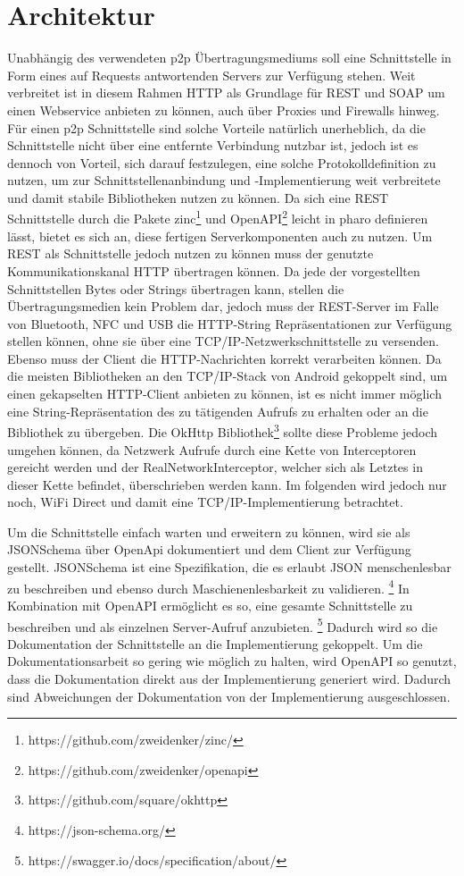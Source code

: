 \section{Architektur}

    Unabhängig des verwendeten p2p Übertragungsmediums soll eine Schnittstelle in Form eines auf Requests antwortenden Servers zur Verfügung stehen.
	Weit verbreitet ist in diesem Rahmen HTTP als Grundlage für REST und SOAP um einen Webservice anbieten zu können, auch über Proxies und Firewalls hinweg. Für einen p2p Schnittstelle sind solche Vorteile natürlich unerheblich, da die Schnittstelle nicht über eine entfernte Verbindung nutzbar ist, jedoch ist es dennoch von Vorteil, sich darauf festzulegen, eine solche Protokolldefinition zu nutzen, um zur Schnittstellenanbindung und -Implementierung weit verbreitete und damit stabile Bibliotheken nutzen zu können.
    Da sich eine REST Schnittstelle durch die Pakete zinc\footnote{https://github.com/zweidenker/zinc/} und OpenAPI\footnote{https://github.com/zweidenker/openapi} leicht in pharo definieren lässt, bietet es sich an, diese fertigen Serverkomponenten auch zu nutzen.
    Um REST als Schnittstelle jedoch nutzen zu können muss der genutzte Kommunikationskanal HTTP übertragen können. Da jede der vorgestellten Schnittstellen Bytes oder Strings
    übertragen kann, stellen die Übertragungsmedien kein Problem dar, jedoch muss der REST-Server im Falle von Bluetooth, NFC und USB die HTTP-String Repräsentationen zur Verfügung stellen können,
    ohne sie über eine TCP/IP-Netzwerkschnittstelle zu versenden. Ebenso muss der Client die HTTP-Nachrichten korrekt verarbeiten können.
    Da die meisten Bibliotheken an den TCP/IP-Stack von Android gekoppelt sind, um einen gekapselten HTTP-Client anbieten zu können, ist es nicht immer möglich eine String-Repräsentation des zu tätigenden Aufrufs zu erhalten oder an die Bibliothek zu übergeben.
    Die OkHttp Bibliothek\footnote{https://github.com/square/okhttp} sollte diese Probleme jedoch umgehen können, da Netzwerk Aufrufe durch eine Kette von Interceptoren gereicht werden und der RealNetworkInterceptor,
    welcher sich als Letztes in dieser Kette befindet, überschrieben werden kann.
	Im folgenden wird jedoch nur noch, WiFi Direct und damit eine TCP/IP-Implementierung betrachtet.
	
    Um die Schnittstelle einfach warten und erweitern zu können, wird sie als JSONSchema über OpenApi dokumentiert und dem Client zur Verfügung gestellt.
    JSONSchema ist eine Spezifikation, die es erlaubt JSON menschenlesbar zu beschreiben und ebenso durch Maschienenlesbarkeit zu validieren. \footnote{https://json-schema.org/} In Kombination mit OpenAPI ermöglicht es so, eine gesamte Schnittstelle zu beschreiben und als einzelnen Server-Aufruf anzubieten. \footnote {https://swagger.io/docs/specification/about/} Dadurch wird so die Dokumentation der Schnittstelle an die Implementierung gekoppelt. Um die Dokumentationsarbeit so gering wie möglich zu halten, wird OpenAPI so genutzt, dass die Dokumentation direkt aus der Implementierung generiert wird. Dadurch sind Abweichungen der Dokumentation von der Implementierung ausgeschlossen.

